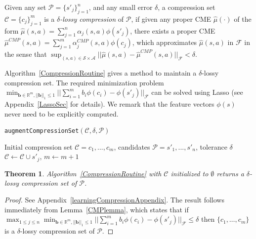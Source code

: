 \documentclass[letterpaper]{article}
\newtheorem{theorem}{Theorem}[section]
\newenvironment{definition}[1][Definition]{\begin{trivlist}
\item[\hskip \labelsep {\bfseries #1}]}{\end{trivlist}}
\newcommand{\cC}{{\mathcal C}}
\newcommand{\cF}{{\mathcal F}}
\newcommand{\cA}{{\mathcal A}}
\newcommand{\cS}{{\mathcal S}}
\newcommand{\cP}{{\mathcal P}}
\newcommand{\R}{{\mathbb R}}
\begin{document}
\begin{definition} \label{lossyCompression}
Given any set $\cP = \{s'_j\}_{j=1}^n$, and any small error $\delta$, a compression set $\cC=\{c_j\}_{j=1}^m$ is a \emph{$\delta$-lossy compression} of $\cP$, if given any proper CME $\hat\mu(\cdot)$ of the form $\hat\mu(s,a) = \sum_{j=1}^n \alpha_j(s,a) \phi(s'_j)$, there exists a proper CME $\hat\mu^{CMP}(s,a) = \sum_{j=1}^m \alpha^{CMP}_j(s,a) \phi(c_j)$, which approximates $\hat\mu(s,a)$ in $\cF$ in the sense that $\sup_{(s,a)\in\cS\times\cA}||\hat\mu(s,a) - \hat\mu^{CMP}(s,a)||_\cF < \delta$.
\end{definition}

Algorithm~\ref{CompressionRoutine} gives a method to maintain a $\delta$-lossy compression set. The required minimization problem $\min_{{\bm b}\in\R^m , ||{\bm b}||_1\le 1} ||\sum_{i=1}^m b_i \phi(c_i) - \phi(s'_j)||_{\cF}$ can be solved using Lasso (see Appendix~\ref{LassoSec} for details). We remark that the feature vectors $\phi(s)$ never need to be explicitly computed.

\begin{algorithm}[htb]
   \caption{\texttt{augmentCompressionSet}$(\cC,\delta,\cP)$}
   \label{CompressionRoutine}
\begin{algorithmic}
     Initial compression set $\cC = {c_1,...,c_m}$, candidates $\cP = {s'_1,...,s'_n}$, tolerance $\delta$
	 \IF {$\min_{{\bm b}\in\R^m , ||{\bm b}||_1\le 1}\hspace{-0.6mm} ||\sum_{i=1}^m b_i \phi(c_i) \hspace{-0.6mm}-\hspace{-0.6mm} \phi(s'_j)||_{\cF} \hspace{-0.6mm}>\hspace{-0.6mm} \delta$}
	  $\cC \leftarrow \cC \cup s'_j$, $m\leftarrow m+1$
   \ENDIF
	\ENDFOR
\end{algorithmic}
\end{algorithm}

\begin{theorem} \label{CompressionTheorem}
Algorithm~\ref{CompressionRoutine} with $\cC$ initialized to $\emptyset$ returns a $\delta$-lossy compression set of $\cP$.
\end{theorem}
\begin{proof} See Appendix~\ref{learningCompressionAppendix}. The result follows immediately from Lemma~\ref{CMPlemma},
which states that if $\max_{1\le j \le n } \min_{{\bm b}\in\R^m , ||{\bm b}||_1\le 1}
 ||\sum_{i=1}^m b_i \phi(c_i)-\phi(s'_j)||_{\cF}\le \delta$ then $\{c_1,\dots,c_m\}$ is a $\delta$-lossy compression set of $\cP$.
\end{proof}
\end{document}
